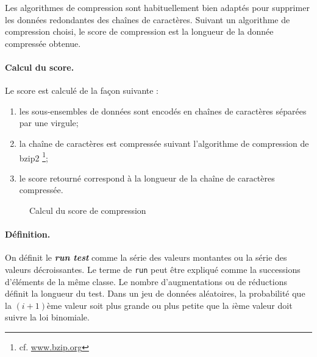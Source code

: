 Les algorithmes de compression sont habituellement bien adaptés pour supprimer les données redondantes des chaînes de caractères. Suivant un algorithme de compression choisi, le score de compression est la longueur de la donnée compressée obtenue. 

\paragraph{Calcul du score.\\}
Le score est calculé de la façon suivante :
\begin{enumerate}
\item les sous-ensembles de données sont encodés en chaînes de caractères séparées par une virgule;
\item la chaîne de caractères est compressée suivant l'algorithme de compression de bzip2 \footnote{cf. \url{www.bzip.org}};
\item le score retourné correspond à la longueur de la chaîne de caractères compressée.\\
\end{enumerate}

\begin{figure}[H]
\begin{center}
\end{center}
\caption{Calcul du score de compression}
\end{figure}

\paragraph{Définition.\\}
On définit le \textbf{\textit{run test}} comme la série des valeurs montantes ou la série des valeurs décroissantes. Le terme de \texttt{run} peut être expliqué comme la successions d'éléments de la même classe. Le nombre d'augmentations ou de réductions définit la longueur du test. Dans un jeu de données aléatoires, la probabilité que la $(i+1)$ème valeur soit plus grande ou plus petite que la $i$ème valeur doit suivre la loi binomiale.\\

